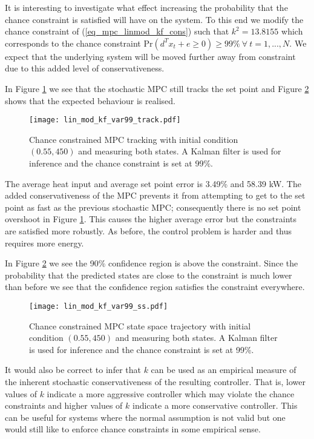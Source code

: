 It is interesting to investigate what effect increasing the probability that the chance constraint is satisfied will have on the system. To this end we modify the chance constraint of (\ref{eq_mpc_linmod_kf_cons}) such that $k^2 = 13.8155$ which corresponds to the chance constraint $\text{Pr}(d^Tx_t + e \geq 0) \geq 99\% ~\forall ~t=1,...,N$. We expect that the underlying system will be moved further away from constraint due to this added level of conservativeness.

In Figure \ref{fig_lin_mod_kf_var99_track} we see that the stochastic MPC still tracks the set point and Figure \ref{fig_lin_mod_kf_var99_ss} shows that the expected behaviour is realised. 
\begin{figure}[H] 
\centering
\texttt{[image: lin\_mod\_kf\_var99\_track.pdf]}
\caption{Chance constrained MPC tracking with initial condition $(0.55, 450)$ and measuring both states. A Kalman filter is used for inference and the chance constraint is set at 99\%.}
\label{fig_lin_mod_kf_var99_track}
\end{figure}
The average heat input and average set point error is 3.49\% and  58.39 kW. The added conservativeness of the MPC prevents it from attempting to get to the set point as fast as the previous stochastic MPC; consequently there is no set point overshoot in Figure \ref{fig_lin_mod_kf_var99_track}. This causes the higher average error but the constraints are satisfied more robustly. As before, the control problem is harder and thus requires more energy.

In Figure \ref{fig_lin_mod_kf_var99_ss} we see the 90\% confidence region is above the constraint. Since the probability that the predicted states are close to the constraint is much lower than before we see that the confidence region satisfies the constraint everywhere.
\begin{figure}[H] 
\centering
\texttt{[image: lin\_mod\_kf\_var99\_ss.pdf]}
\caption{Chance constrained MPC state space trajectory with initial condition $(0.55, 450)$ and measuring both states. A Kalman filter is used for inference and the chance constraint is set at 99\%.}
\label{fig_lin_mod_kf_var99_ss}
\end{figure}
It would also be correct to infer that $k$ can be used as an empirical measure of the inherent stochastic conservativeness of the resulting controller. That is, lower values of $k$ indicate a more aggressive controller which may violate the chance constraints and higher values of $k$ indicate a more conservative controller. This can be useful for systems where the normal assumption is not valid but one would still like to enforce chance constraints in some empirical sense. 

